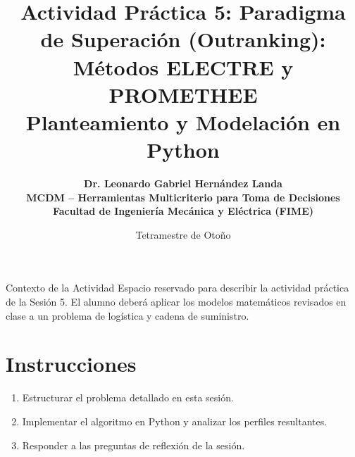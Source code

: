 \documentclass[11pt,a4paper]{article}
\title{%
  \sffamily\bfseries\color{UANLblue}%
  Actividad Práctica 5: Paradigma de Superación (Outranking): Métodos ELECTRE y PROMETHEE\\
  \large Planteamiento y Modelación en Python
}
\author{%
  \sffamily\bfseries\color{FIMEdarkgray}%
  Dr. Leonardo Gabriel Hernández Landa\\
  \small MCDM -- Herramientas Multicriterio para Toma de Decisiones\\
  \small\color{FIMEgreen}Facultad de Ingeniería Mecánica y Eléctrica (FIME)
}
\date{\sffamily Tetramestre de Otoño}
\begin{document}
\maketitle
\thispagestyle{fancy}

\begin{brandbox}{Contexto de la Actividad}
  Espacio reservado para describir la actividad práctica de la Sesión 5. El alumno deberá aplicar los modelos matemáticos revisados en clase a un problema de logística y cadena de suministro.
\end{brandbox}

\section{Instrucciones}
\begin{enumerate}
    \item Estructurar el problema detallado en esta sesión.
    \item Implementar el algoritmo en Python y analizar los perfiles resultantes.
    \item Responder a las preguntas de reflexión de la sesión.
\end{enumerate}
\end{document}
